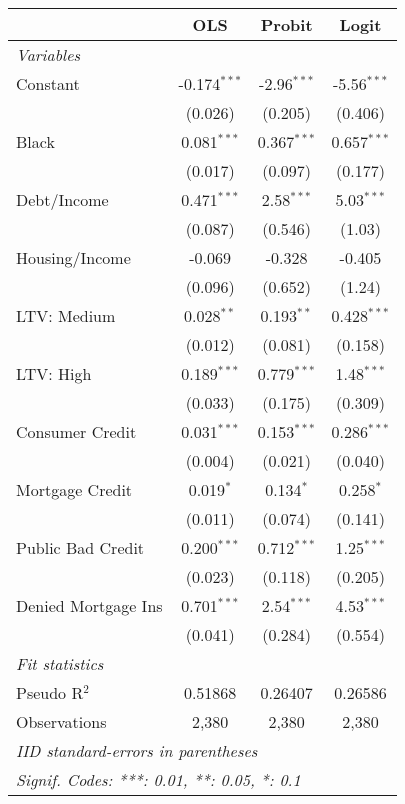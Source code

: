
   \begin{tabular}{lccc}
      \toprule
                          &  OLS           & Probit        & Logit\\  
      \midrule
      \emph{Variables}\\
      Constant            & -0.174$^{***}$ & -2.96$^{***}$ & -5.56$^{***}$\\   
                          & (0.026)        & (0.205)       & (0.406)\\   
      Black               & 0.081$^{***}$  & 0.367$^{***}$ & 0.657$^{***}$\\   
                          & (0.017)        & (0.097)       & (0.177)\\   
      Debt/Income         & 0.471$^{***}$  & 2.58$^{***}$  & 5.03$^{***}$\\   
                          & (0.087)        & (0.546)       & (1.03)\\   
      Housing/Income      & -0.069         & -0.328        & -0.405\\   
                          & (0.096)        & (0.652)       & (1.24)\\   
      LTV: Medium         & 0.028$^{**}$   & 0.193$^{**}$  & 0.428$^{***}$\\   
                          & (0.012)        & (0.081)       & (0.158)\\   
      LTV: High           & 0.189$^{***}$  & 0.779$^{***}$ & 1.48$^{***}$\\   
                          & (0.033)        & (0.175)       & (0.309)\\   
      Consumer Credit     & 0.031$^{***}$  & 0.153$^{***}$ & 0.286$^{***}$\\   
                          & (0.004)        & (0.021)       & (0.040)\\   
      Mortgage Credit     & 0.019$^{*}$    & 0.134$^{*}$   & 0.258$^{*}$\\   
                          & (0.011)        & (0.074)       & (0.141)\\   
      Public Bad Credit   & 0.200$^{***}$  & 0.712$^{***}$ & 1.25$^{***}$\\   
                          & (0.023)        & (0.118)       & (0.205)\\   
      Denied Mortgage Ins & 0.701$^{***}$  & 2.54$^{***}$  & 4.53$^{***}$\\   
                          & (0.041)        & (0.284)       & (0.554)\\   
      \midrule
      \emph{Fit statistics}\\
      Pseudo R$^2$        & 0.51868        & 0.26407       & 0.26586\\  
      Observations        & 2,380          & 2,380         & 2,380\\  
      \bottomrule
      \multicolumn{4}{l}{\emph{IID standard-errors in parentheses}}\\
      \multicolumn{4}{l}{\emph{Signif. Codes: ***: 0.01, **: 0.05, *: 0.1}}\\
   \end{tabular}
